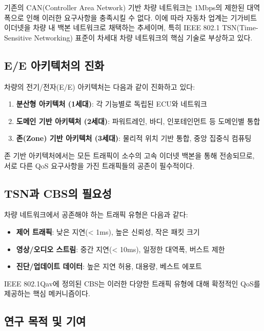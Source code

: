 \documentclass[10pt,twocolumn]{IEEEtran}
\begin{document}
기존의 CAN(Controller Area Network) 기반 차량 네트워크는 1Mbps의 제한된 대역폭으로 인해 이러한 요구사항을 충족시킬 수 없다. 이에 따라 자동차 업계는 기가비트 이더넷을 차량 내 백본 네트워크로 채택하는 추세이며, 특히 IEEE 802.1 TSN(Time-Sensitive Networking) 표준이 차세대 차량 네트워크의 핵심 기술로 부상하고 있다\cite{tsn_automotive2023}.

\subsection{E/E 아키텍처의 진화}

차량의 전기/전자(E/E) 아키텍처는 다음과 같이 진화하고 있다:

\begin{enumerate}
\item \textbf{분산형 아키텍처 (1세대)}: 각 기능별로 독립된 ECU와 네트워크
\item \textbf{도메인 기반 아키텍처 (2세대)}: 파워트레인, 바디, 인포테인먼트 등 도메인별 통합
\item \textbf{존(Zone) 기반 아키텍처 (3세대)}: 물리적 위치 기반 통합, 중앙 집중식 컴퓨팅
\end{enumerate}

존 기반 아키텍처에서는 모든 트래픽이 소수의 고속 이더넷 백본을 통해 전송되므로, 서로 다른 QoS 요구사항을 가진 트래픽들의 공존이 필수적이다\cite{zone_arch2024}.

\subsection{TSN과 CBS의 필요성}

차량 네트워크에서 공존해야 하는 트래픽 유형은 다음과 같다:

\begin{itemize}
\item \textbf{제어 트래픽}: 낮은 지연(< 1ms), 높은 신뢰성, 작은 패킷 크기
\item \textbf{영상/오디오 스트림}: 중간 지연(< 10ms), 일정한 대역폭, 버스트 제한
\item \textbf{진단/업데이트 데이터}: 높은 지연 허용, 대용량, 베스트 에포트
\end{itemize}

IEEE 802.1Qav에 정의된 CBS는 이러한 다양한 트래픽 유형에 대해 확정적인 QoS를 제공하는 핵심 메커니즘이다\cite{ieee8021qav}.

\subsection{연구 목적 및 기여}
\end{document}
